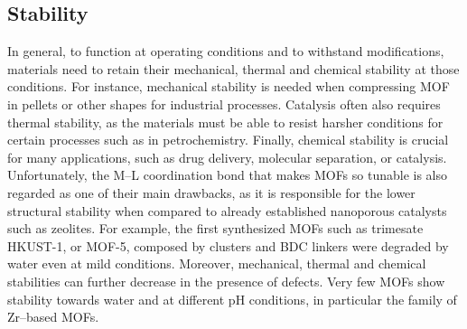 \subsection*{Stability}
In general, to function at operating conditions and to withstand modifications, materials need to retain their mechanical, thermal and chemical stability at those conditions\cite{howarth2016chemical}. For instance, mechanical stability is needed when compressing MOF in pellets or other shapes for industrial processes\cite{chapman2009pressure}. Catalysis often also requires thermal stability, as the materials must be able to resist harsher conditions for certain processes such as in petrochemistry. Finally, chemical stability is crucial for many applications, such as drug delivery, molecular separation, or catalysis\cite{horcajada2010porous}. 
\npar
Unfortunately, the M--L coordination bond that makes MOFs so tunable is also regarded as one of their main drawbacks\cite{keskin2010can, canivet2014water, kizzie2011effect}, as it is responsible for the lower structural stability when compared to already established nanoporous catalysts such as zeolites. 
For example, the first synthesized MOFs such as  trimesate HKUST-1, or MOF-5, composed by  clusters and BDC linkers were degraded by water even at mild conditions\cite{greathouse2006interaction, low2009virtual, kaye2007impact, decoste2013effect}. Moreover, mechanical, thermal and chemical stabilities can further decrease in the presence of defects. Very few MOFs show stability towards water and at different pH conditions\cite{leus2016systematic}, in particular the family of Zr--based MOFs. 

